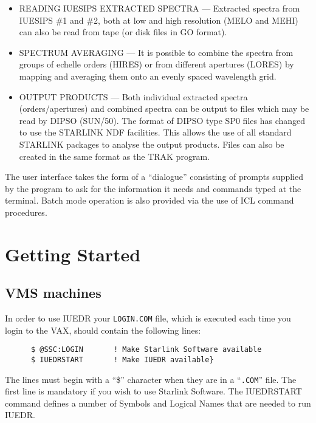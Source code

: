 \begin {itemize}
\item READING IUESIPS EXTRACTED SPECTRA --- Extracted spectra from
IUESIPS \#1 and \#2, both at low and high resolution (MELO and MEHI)
can also be read from tape (or disk files in GO format).

\item SPECTRUM AVERAGING --- It is possible to combine the spectra
from groups of echelle orders (HIRES) or from different apertures
(LORES) by mapping and averaging them onto an evenly spaced wavelength
grid.

\item OUTPUT PRODUCTS --- Both individual extracted spectra
(orders/apertures) and combined spectra can be output to files which
may be read by DIPSO (SUN/50). The format of DIPSO type SP0 files has
changed to use the STARLINK NDF facilities. This allows the use of all
standard STARLINK packages to  analyse the output products. Files can
also be created in the same format as the TRAK program.

\end {itemize}

The user interface takes the form of a ``dialogue'' consisting of 
prompts supplied by the program to ask for the information it needs
and  commands typed  at the terminal. Batch mode operation is also
provided via the use of ICL command procedures.

\section {Getting Started}

\subsection{VMS machines}

In order to use IUEDR your {\tt LOGIN.COM} file, which is executed each time
you login to the VAX, should contain the following lines:

\begin{verbatim}
      $ @SSC:LOGIN       ! Make Starlink Software available
      $ IUEDRSTART       ! Make IUEDR available}
\end{verbatim}

The lines must begin with a ``\$'' character when they are in a
``{\tt .COM}'' file. The first line is mandatory if you wish to use Starlink
Software. The IUEDRSTART command defines a number of Symbols and
Logical Names that are needed to run IUEDR.

